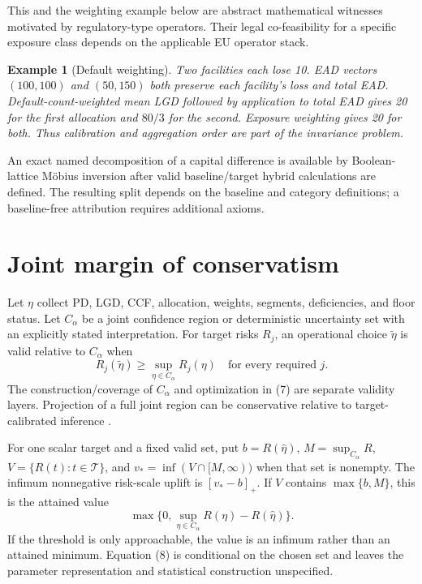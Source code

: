 \documentclass[a4paper,10pt]{article}
\newtheorem{example}{Example}
\begin{document}
This and the weighting example below are abstract mathematical witnesses
motivated by regulatory-type operators.  Their legal co-feasibility for a
specific exposure class depends on the applicable EU operator stack.

\begin{example}[Default weighting]
Two facilities each lose 10. EAD vectors $(100,100)$ and $(50,150)$ both preserve each facility's loss and total EAD. Default-count-weighted mean LGD followed by application to total EAD gives 20 for the first allocation and $80/3$ for the second. Exposure weighting gives 20 for both. Thus calibration and aggregation order are part of the invariance problem.
\end{example}

An exact named decomposition of a capital difference is available by
Boolean-lattice M\"obius inversion after valid baseline/target hybrid
calculations are defined.  The resulting split depends on the baseline and
category definitions; a baseline-free attribution requires additional axioms.

\section{Joint margin of conservatism}

Let $\eta$ collect PD, LGD, CCF, allocation, weights, segments, deficiencies, and floor status. Let $C_\alpha$ be a joint confidence region or deterministic uncertainty set with an explicitly stated interpretation. For target risks $R_j$, an operational choice $\tilde\eta$ is valid relative to $C_\alpha$ when
\[
R_j(\tilde\eta)\ge \sup_{\eta\in C_\alpha}R_j(\eta)\quad\text{for every required }j. \tag{7}
\]
The construction/coverage of $C_\alpha$ and optimization in (7) are separate validity layers. Projection of a full joint region can be conservative relative to target-calibrated inference \cite{kaido2019}.

For one scalar target and a fixed valid set, put $b=R(\hat\eta)$, $M=\sup_{C_\alpha}R$, $V=\{R(t):t\in\mathcal T\}$, and $v_*=\inf(V\cap[M,\infty))$ when that set is nonempty. The infimum nonnegative risk-scale uplift is $[v_*-b]_+$. If $V$ contains $\max\{b,M\}$, this is the attained value
\[
\max\{0,\sup_{\eta\in C_\alpha}R(\eta)-R(\hat\eta)\}. \tag{8}
\]
If the threshold is only approachable, the value is an infimum rather than an
attained minimum. Equation (8) is conditional on the chosen set and leaves the
parameter representation and statistical construction unspecified.
\end{document}
